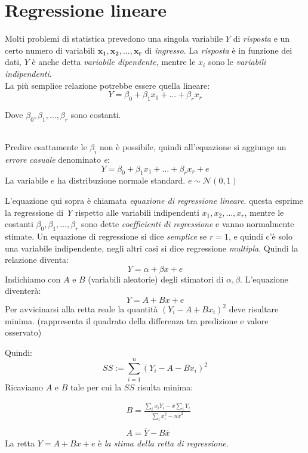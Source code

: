 \documentclass[]{article}
\begin{document}
    \section{Regressione lineare}\label{sec:regressione-lineare}
    Molti problemi di statistica prevedono una singola variabile $Y$ di \emph{risposta} e un certo numero di variabili $\boldsymbol{x_1, x_2, \ldots, x_r}$ di \emph{ingresso}. La \emph{risposta} è in funzione dei dati, $Y$ è anche detta \emph{variabile dipendente}, mentre le $x_i$ sono le \emph{variabili indipendenti}.\\
    La più semplice relazione potrebbe essere quella lineare:
    \[ Y = \beta_0 + \beta_1x_1 + \ldots  + \beta_rx_r \]
    \centerline{Dove $\beta_0, \beta_1, \ldots, \beta_r$ sono costanti.} \\[2ex]
    Predire esattamente le $\beta_i$ non è possibile, quindi all'equazione si aggiunge un \emph{errore casuale} denominato \emph{e}:
    \[ Y = \beta_0 + \beta_1x_1 + \ldots + \beta_rx_r + e \]
    La variabile $e$ ha distribuzione normale standard. $e \sim \mathcal N(0,1)$
    
    L'equazione qui sopra è chiamata \emph{equazione di regressione lineare}.
    questa esprime la regressione di \emph{Y} rispetto alle variabili indipendenti $x_1, x_2, \ldots, x_r$, mentre le costanti $\beta_0, \beta_1, \ldots, \beta_r$ sono dette \emph{coefficienti di regressione} e vanno normalmente stimate.
    Un equazione di regressione si dice \emph{semplice} se $r = 1$, e quindi c'è solo una variabile indipendente, negli altri casi si dice regressione \emph{multipla}.
    Quindi la relazione diventa:
    \[ Y = \alpha + \beta x + e \]
    Indichiamo con $A$ e $B$ (variabili aleatorie) degli stimatori di $\alpha, \beta$.
    L'equazione diventerà:
    \[ Y = A + Bx + e \]
    Per avvicinarsi alla retta reale la quantità $(Y_i - A + Bx_i)^2$ deve risultare minima.
    (rappresenta il quadrato della differenza tra predizione e valore osservato)
    
    Quindi:
    \[ SS := \sum_{i = 1}^{n}(Y_i-A-Bx_i)^2 \]
    Ricaviamo $A$ e $B$ tale per cui la $SS$ risulta minima:
     
    \begin{equation*}
        \begin{split}
            &B = \frac{\sum_ix_iY_i - \overline{x}\sum_i Y_i }{\sum_i x_i^2 - n \overline x^2} \\ \\
            &A = \overline Y - B \overline x
        \end{split}
    \end{equation*}
    La retta $Y = A + Bx + e$ è \emph{la stima della retta di regressione}.   
\end{document}
